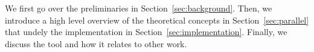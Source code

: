 

We first go over the preliminaries in Section~\ref{sec:background}. Then, we introduce a high level overview of the theoretical concepts in Section~\ref{sec:parallel} that undely the implementation in Section~\ref{sec:implementation}. Finally, we discuss the tool and how it relates to other work.
